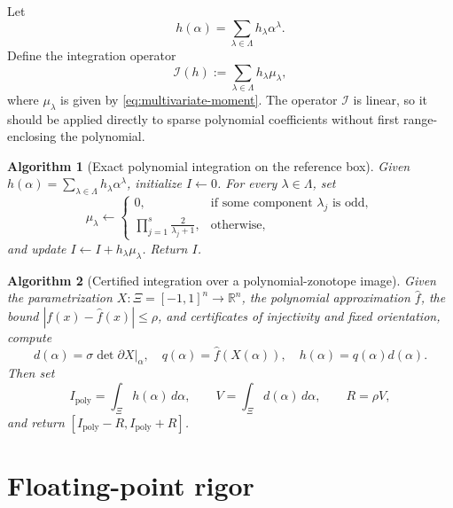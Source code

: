 \documentclass[11pt]{article}
\newtheorem{algorithmblock}{Algorithm}
\newcommand{\R}{\mathbb{R}}
\newcommand{\abs}[1]{\left\lvert #1\right\rvert}
\begin{document}
Let
\[
    h(\alpha)=\sum_{\lambda\in\Lambda} h_\lambda\alpha^\lambda.
\]
Define the integration operator
\begin{equation}
    \mathcal{I}(h)
    :=
    \sum_{\lambda\in\Lambda} h_\lambda\mu_\lambda,
    \label{eq:integration-operator}
\end{equation}
where \(\mu_\lambda\) is given by \eqref{eq:multivariate-moment}. The operator \(\mathcal{I}\) is linear, so it should be applied directly to sparse polynomial coefficients without first range-enclosing the polynomial.

\begin{algorithmblock}[Exact polynomial integration on the reference box]
\label{alg:polynomial-box-integration}
Given \(h(\alpha)=\sum_{\lambda\in\Lambda}h_\lambda\alpha^\lambda\),
initialize \(I\gets0\).  For every \(\lambda\in\Lambda\), set
\[
 \mu_\lambda\gets
 \begin{cases}
 0,&\text{if some component \(\lambda_j\) is odd},\\[1mm]
 \displaystyle\prod_{j=1}^s\frac{2}{\lambda_j+1},&\text{otherwise},
 \end{cases}
\]
and update \(I\gets I+h_\lambda\mu_\lambda\).  Return \(I\).
\end{algorithmblock}

\begin{algorithmblock}[Certified integration over a polynomial-zonotope image]
\label{alg:certified-pz-integration}
Given the parametrization \(X:\Xi=[-1,1]^n\to\R^n\), the polynomial
approximation \(\widehat f\), the bound
\(\abs{f(x)-\widehat f(x)}\leq\rho\), and certificates of injectivity and
fixed orientation, compute
\[
 d(\alpha)=\sigma\det\left.\partial X\right|_\alpha,
 \quad q(\alpha)=\widehat f(X(\alpha)),
 \quad h(\alpha)=q(\alpha)d(\alpha).
\]
Then set
\[
 I_{\mathrm{poly}}=\int_\Xi h(\alpha)\,d\alpha,
 \qquad V=\int_\Xi d(\alpha)\,d\alpha,
 \qquad R=\rho V,
\]
and return \([I_{\mathrm{poly}}-R,I_{\mathrm{poly}}+R]\).
\end{algorithmblock}

\section{Floating-point rigor}
\end{document}
